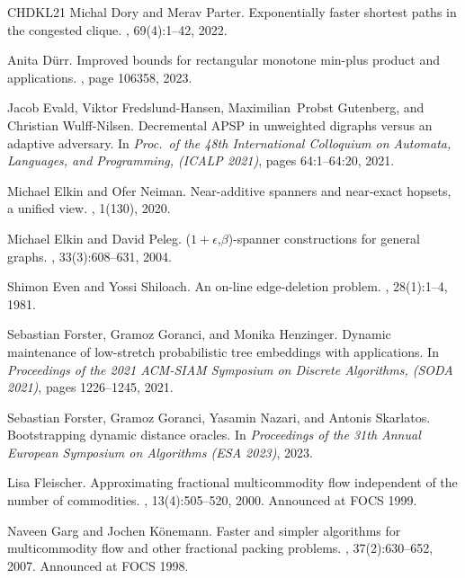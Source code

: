 \documentclass[11pt]{article}
\theoremstyle{definition}
\theoremstyle{remark}
\begin{document}
\begin{thebibliography}{CHDKL21}
Michal Dory and Merav Parter.
\newblock Exponentially faster shortest paths in the congested clique.
, 69(4):1--42, 2022.

Anita D{\"u}rr.
\newblock Improved bounds for rectangular monotone min-plus product and
  applications.
, page 106358, 2023.

Jacob Evald, Viktor Fredslund{-}Hansen, Maximilian~Probst Gutenberg, and
  Christian Wulff{-}Nilsen.
\newblock Decremental {APSP} in unweighted digraphs versus an adaptive
  adversary.
\newblock In {\em Proc.\ of the 48th International Colloquium on Automata,
  Languages, and Programming, ({ICALP} 2021)}, pages 64:1--64:20, 2021.

Michael Elkin and Ofer Neiman.
\newblock Near-additive spanners and near-exact hopsets, a unified view.
, 1(130), 2020.

Michael Elkin and David Peleg.
\newblock ($1+\epsilon$,$\beta$)-spanner constructions for general graphs.
, 33(3):608--631, 2004.

Shimon Even and Yossi Shiloach.
\newblock An on-line edge-deletion problem.
, 28(1):1--4, 1981.

Sebastian Forster, Gramoz Goranci, and Monika Henzinger.
\newblock Dynamic maintenance of low-stretch probabilistic tree embeddings with
  applications.
\newblock In {\em Proceedings of the 2021 {ACM-SIAM} Symposium on Discrete
  Algorithms, ({SODA} 2021)}, pages 1226--1245, 2021.

Sebastian Forster, Gramoz Goranci, Yasamin Nazari, and Antonis Skarlatos.
\newblock Bootstrapping dynamic distance oracles.
\newblock In {\em Proceedings of the 31th Annual European Symposium on
  Algorithms ({ESA} 2023)}, 2023.

Lisa Fleischer.
\newblock Approximating fractional multicommodity flow independent of the
  number of commodities.
, 13(4):505--520, 2000.
\newblock Announced at {FOCS} 1999.

Naveen Garg and Jochen K{\"{o}}nemann.
\newblock Faster and simpler algorithms for multicommodity flow and other
  fractional packing problems.
, 37(2):630--652, 2007.
\newblock Announced at {FOCS} 1998.


\end{thebibliography}
\end{document}
